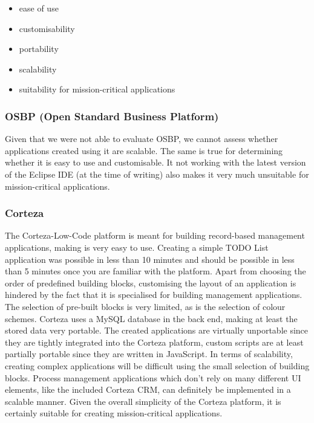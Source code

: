 \documentclass[runningheads]{llncs}
\begin{document}
\begin{itemize}
  \item ease of use
  \item customisability
  \item portability
  \item scalability
  \item suitability for mission-critical applications
\end{itemize}

\subsubsection{OSBP (Open Standard Business Platform)}

Given that we were not able to evaluate OSBP, we cannot assess whether applications created using it are scalable. The same is true for determining whether it is easy to use and customisable. It not working with the latest version of the Eclipse IDE (at the time of writing) also makes it very much unsuitable for mission-critical applications.

\subsubsection{Corteza}

The Corteza-Low-Code platform is meant for building record-based management applications, making is very easy to use. Creating a simple TODO List application was possible in less than 10 minutes and should be possible in less than 5 minutes once you are familiar with the platform. Apart from choosing the order of predefined building blocks, customising the layout of an application is hindered by the fact that it is specialised for building management applications. The selection of pre-built blocks is very limited, as is the selection of colour schemes. Corteza uses a MySQL database in the back end, making at least the stored data very portable. The created applications are virtually unportable since they are tightly integrated into the Corteza platform, custom scripts are at least partially portable since they are written in JavaScript. In terms of scalability, creating complex applications will be difficult using the small selection of building blocks. Process management applications which don't rely on many different UI elements, like the included Corteza CRM, can definitely be implemented in a scalable manner. Given the overall simplicity of the Corteza platform, it is certainly suitable for creating mission-critical applications.
\end{document}
